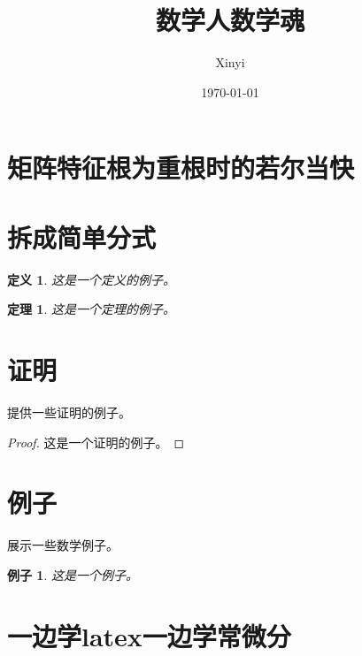 \documentclass[12pt, a4paper]{article}
\newtheorem{theorem}{定理}[section]
\newtheorem{definition}{定义}[section]
\newtheorem{example}{例子}[section]
\begin{document}
\title{数学人数学魂}
\author{Xinyi}
\date{\today}
\maketitle


\section{矩阵特征根为重根时的若尔当快}

\section{拆成简单分式}
\begin{definition}
    这是一个定义的例子。
\end{definition}

\begin{theorem}
    这是一个定理的例子。
\end{theorem}

\section{证明}
提供一些证明的例子。

\begin{proof}
    这是一个证明的例子。
\end{proof}

\section{例子}
展示一些数学例子。

\begin{example}
    这是一个例子。
\end{example}

\section{一边学latex一边学常微分}


\end{document}
